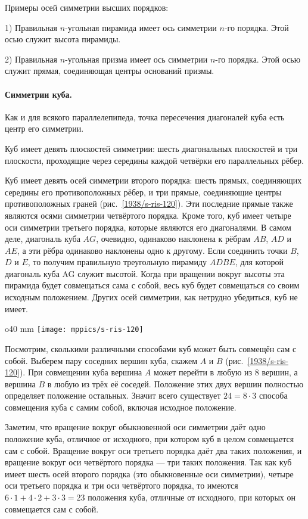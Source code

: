 Примеры осей симметрии высших порядков:

1) Правильная $n$-угольная пирамида имеет ось симметрии $n$-го порядка.
Этой осью служит высота пирамиды.

2) Правильная $n$-угольная призма имеет ось симметрии $n$-го порядка.
Этой осью служит прямая, соединяющая центры оснований призмы.

\paragraph{Симметрии куба.}\label{1938/s104}
Как и для всякого параллелепипеда, точка пересечения диагоналей куба есть центр его симметрии.

Куб имеет девять плоскостей симметрии: шесть диагональных плоскостей и три плоскости, проходящие через середины каждой четвёрки его параллельных рёбер.

Куб имеет девять осей симметрии второго порядка: шесть прямых, соединяющих середины его противоположных рёбер, и три прямые, соединяющие центры противоположных граней (рис.~\ref{1938/s-ris-120}).
Эти последние прямые также являются осями симметрии четвёртого порядка.
Кроме того, куб имеет четыре оси симметрии третьего порядка, которые являются его диагоналями.
В самом деле, диагональ куба $AG$, очевидно, одинаково наклонена к рёбрам $AB$, $AD$ и $AE$, а эти рёбра одинаково наклонены одно к другому.
Если соединить точки $B$, $D$ и $E$, то получим правильную треугольную пирамиду $ADBE$, для которой диагональ куба AG служит высотой.
Когда при вращении вокруг высоты эта пирамида будет совмещаться сама с собой, весь куб будет совмещаться со своим исходным положением.
Других осей симметрии, как нетрудно убедиться, куб не имеет.

\begin{wrapfigure}{o}{40 mm}
\vskip-0mm
\centering
\texttt{[image: mppics/s-ris-120]}
\caption{}\label{1938/s-ris-120}
\vskip-0mm
\end{wrapfigure}

Посмотрим, сколькими различными способами куб может быть совмещён сам с собой.
Выберем пару соседних вершин куба, скажем $A$ и $B$ (рис.~\ref{1938/s-ris-120}).
При совмещении куба вершина $A$ может перейти в любую из 8 вершин, 
а вершина $B$ в любую из трёх её соседей.
Положение этих двух вершин полностью определяет положение остальных.
Значит всего существует $24=8\cdot 3$  способа совмещения куба с самим собой, включая исходное положение.

Заметим, что вращение вокруг обыкновенной оси симметрии даёт одно положение куба, отличное от исходного, при котором куб в целом совмещается сам с собой.
Вращение вокруг оси третьего порядка даёт два таких положения, и вращение вокруг оси четвёртого порядка — три таких положения.
Так как куб имеет шесть осей второго порядка (это обыкновенные оси симметрии), четыре оси третьего порядка и три оси четвёртого порядка, то имеются $6\cdot 1 + 4\cdot 2 + 3\cdot 3 = 23$ положения куба, отличные от исходного, при которых он совмещается сам с собой. 

